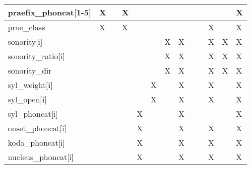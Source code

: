 \begin{sidewaystable}
{\begin{tabular}{|l|l|l|l|l|l|l|l|l|l|l|l|l|}
praefix\_phoncat{[}1-5{]} & X             &              & X           &               &              &                &            &                 &            &              &               & X         \\ \hline
prae\_class               & X             &              & X           &               &              &                &            &                 &            & X            &               & X         \\ \hline
sonority{[}i{]}           &               &              &             &               &              & X              & X          &                 &            & X            & X             & X         \\ \hline
sonority\_ratio{[}i{]}    &               &              &             &               &              & X              & X          &                 &            & X            & X             & X         \\ \hline
sonority\_dir             &               &              &             &               &              & X              & X          &                 &            & X            & X             & X         \\ \hline
syl\_weight{[}i{]}        &               &              &             &               & X            &                & X          &                 &            & X            &               & X         \\ \hline
syl\_open{[}i{]}          &               &              &             &               & X            &                & X          &                 &            & X            &               & X         \\ \hline
syl\_phoncat{[}i{]}       &               &              &             & X             &              &                & X          &                 &            &              &               & X         \\ \hline
onset\_phoncat{[}i{]}     &               &              &             & X             &              &                & X          &                 &            & X            &               & X         \\ \hline
koda\_phoncat{[}i{]}      &               &              &             & X             &              &                & X          &                 &            & X            &               & X         \\ \hline
nucleus\_phoncat{[}i{]}   &               &              &             & X             &              &                & X          &                 &            & X            &               & X         \\ \hline

\end{tabular}}
\end{sidewaystable}
